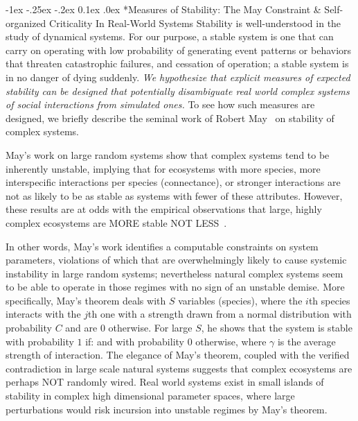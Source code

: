 \documentclass[onecolumn, compsoc,11pt]{IEEEtran}
\makeatletter
\renewcommand\subsection{\@startsection {section}{1}{\z@}%
  {-1ex \@plus -.25ex \@minus -.2ex}%
  {0.1ex \@plus.0ex}%
  {\fontsize{11}{10}\selectfont\bfseries\sffamily\color{DodgerBlue4}}}
\makeatother
\begin{document}
  
\subsection*{Measures of Stability: The May Constraint \& Self-organized Criticality In Real-World Systems}
Stability is well-understood  in the study of dynamical systems. For our purpose, a stable system  is one that can carry on operating with low probability of generating event patterns or behaviors that threaten catastrophic failures, and cessation of operation; a stable system  is in no danger of dying suddenly. \textit{We hypothesize that explicit  measures of expected stability can be designed that potentially disambiguate real world complex systems of social interactions from simulated ones.} To see how such measures are  designed, we  briefly describe the seminal work of Robert May~\cite{may1972will,may2001stability} on  stability of complex systems.

May's work on  large random systems  show  that  complex systems tend to be inherently unstable, implying that for  ecosystems with more species, more interspecific interactions per species (connectance), or stronger interactions are not as likely to  be as stable as systems with fewer of these attributes. However, these results are at odds with the empirical  observations  that large, highly complex ecosystems are  MORE stable NOT LESS~\cite{jacquet2016no}.

In other words, May's work identifies a computable constraints on system parameters, violations of which  that are overwhelmingly likely to cause systemic instability in large random systems; nevertheless natural complex systems seem to be able to operate in those regimes with no sign of an unstable demise.
%
More specifically, May's theorem deals with  $S$ variables (species), where the $i$th species interacts with the $j$th one with a strength  drawn  from a normal distribution
 with probability $C$ and are $0$ otherwise.
For large $S$, he shows that the system is stable with probability $1$ if:
\noindent and with probability 0 otherwise, where $\gamma$ is the average strength of interaction.
The elegance of May's theorem, coupled with the  verified contradiction in large scale natural systems suggests that  complex ecosystems are perhaps  NOT  randomly wired. Real world  systems exist in small islands of stability in complex high dimensional parameter spaces, where  large perturbations would risk incursion into unstable regimes by  May's theorem.
\end{document}
